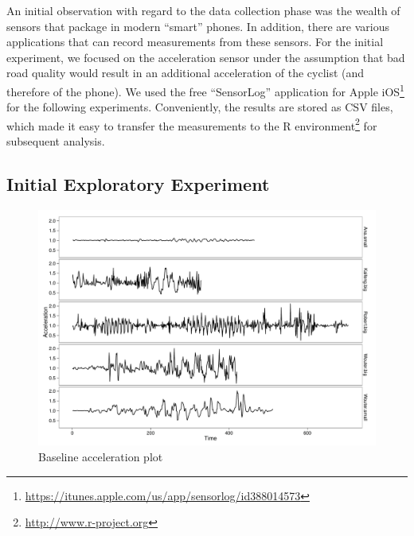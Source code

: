 \documentclass[a4paper,11pt]{article}
\begin{document}
An initial observation with regard to the data collection phase was 
the wealth of sensors that package in modern ``smart'' phones. 
In addition, there are various applications that can record 
measurements from these sensors. 
For the initial experiment, we focused on the acceleration 
sensor under the assumption that bad road quality would result in 
an additional acceleration of the cyclist (and therefore of the phone). 
We used the free ``SensorLog'' application for Apple 
iOS\footnote{\url{https://itunes.apple.com/us/app/sensorlog/id388014573}} 
for the following experiments. 
Conveniently, the results are stored as CSV files, 
which made it easy to transfer the measurements to the R 
environment\footnote{\url{http://www.r-project.org}} for subsequent analysis.

\subsection{Initial Exploratory Experiment}

\begin{figure}
\centering
\includegraphics[width=13cm]{figures/accelerationplot}
\caption{Baseline acceleration plot}
\label{fig:accplot}
\end{figure}
\end{document}
